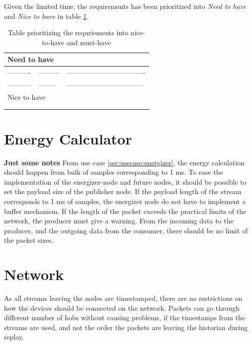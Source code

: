 Given the limited time, the requirements has been prioritized into \textit{Need to have} and \textit{Nice to have} in table \ref{sec:analysis:historian:tablefeatures}.
\begin{table}[h!]
\centering
\caption{Table prioritizing the requriements into nice-to-have and must-have}
\label{sec:analysis:historian:tablefeatures}
\begin{tabular}{l|l|l}

\multicolumn{3}{l}{Need to have}              \\ \hline
----------  & --------- & ---------------------------------- \\ \hline
----------- & --------  & --------------------------------- \\ \hline
\multicolumn{3}{l}{Nice to have}              \\ \hline
            &           &                       \\ \hline
            &           &                       \\ \hline
\end{tabular}
\end{table}

\section{Energy Calculator} \label{sec:analysis:energy}
\textbf{Just some notes}
From use case \ref{sec:usecase:energizer}, the energy calculation should happen from bulk of samples corresponding to 1 ms. To ease the implementation of the energizer-node and future nodes, it should be possible to set the payload size of the publisher node. If the payload length of the stream corresponds to 1 ms of samples, the energizer node do not have to implement a buffer mechanism. If the length of the packet exceeds the practical limits of the network, the producer must give a warning. From the incoming data to the producer, and the outgoing data from the consumer, there should be no limit of the packet sizes.

\section{Network} \label{sec:analysis:network}
As all streams leaving the nodes are timestamped, there are no restrictions on how the devices should be connected on the network. Packets can go through different number of hobs without causing problems, if the timestamps from the streams are used, and not the order the packets are leaving the historian during replay.

